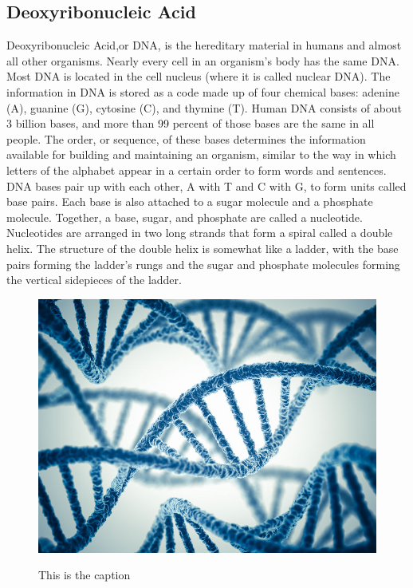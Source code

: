 \documentclass{llncs}
\begin{document}
\subsection{Deoxyribonucleic Acid}
Deoxyribonucleic Acid,or DNA, is the hereditary material in humans and almost all other organisms. Nearly every cell in an organism’s body has the same DNA. Most DNA is located in the cell nucleus (where it is called nuclear DNA).
The information in DNA is stored as a code made up of four chemical bases: adenine (A), guanine (G), cytosine (C), and thymine (T). Human DNA consists of about 3 billion bases, and more than 99 percent of those bases are the same in all people. The order, or sequence, of these bases determines the information available for building and maintaining an organism, similar to the way in which letters of the alphabet appear in a certain order to form words and sentences.
DNA bases pair up with each other, A with T and C with G, to form units called base pairs. Each base is also attached to a sugar molecule and a phosphate molecule. Together, a base, sugar, and phosphate are called a nucleotide. Nucleotides are arranged in two long strands that form a spiral called a double helix. The structure of the double helix is somewhat like a ladder, with the base pairs forming the ladder’s rungs and the sugar and phosphate molecules forming the vertical sidepieces of the ladder.

\begin{figure}
	\centering
	\includegraphics{./figs/DNA-1}
	\label{fig:fig1}
	\caption[caption]{This is the caption}
\end{figure}
\end{document}
